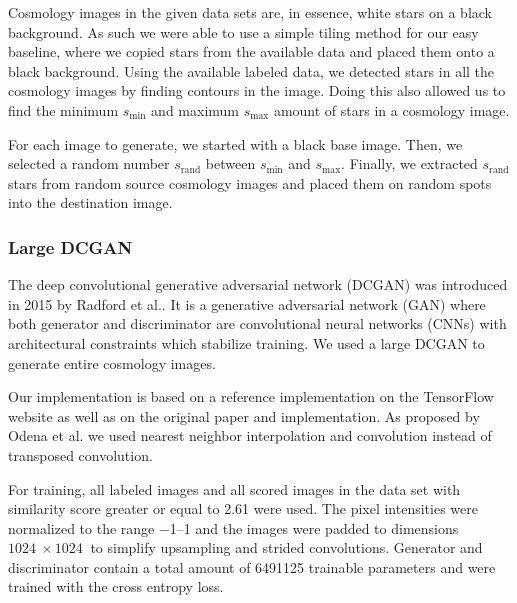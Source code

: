 \documentclass[10pt,conference,compsocconf]{IEEEtran}
\begin{document}

Cosmology images in the given data sets are, in essence, white stars on a black background. As such we were able to use a simple tiling method for our easy baseline, where we copied stars from the available data and placed them onto a black background. Using the available labeled data, we detected stars in all the cosmology images by finding contours in the image. Doing this also allowed us to find the minimum $s_{\text{min}}$ and maximum $s_{\text{max}}$ amount of stars in a cosmology image.

For each image to generate, we started with a black base image. Then, we selected a random number $s_{\text{rand}}$ between $s_{\text{min}}$ and $s_{\text{max}}$. Finally, we extracted $s_{\text{rand}}$ stars from random source cosmology images and placed them on random spots into the destination image.

\subsubsection{Large DCGAN}

The deep convolutional generative adversarial network (DCGAN) was introduced in 2015 by Radford et al.\@ \cite{Radford}. It is a generative adversarial network (GAN) where both generator and discriminator are convolutional neural networks (CNNs) with architectural constraints which stabilize training. We used a large DCGAN to generate entire cosmology images. 

Our implementation is based on a reference implementation on the TensorFlow website \cite{dcgantf} as well as on the original paper and implementation. As proposed by Odena et al.\@ \cite{Odena} we used nearest neighbor interpolation and convolution instead of transposed convolution.

For training, all labeled images and all scored images in the data set with similarity score greater or equal to \SI{2.61}{} were used. The pixel intensities were normalized to the range \SIrange{-1}{1}{} and the images were padded to dimensions $\SI{1024}{}\times\SI{1024}{}$ to simplify upsampling and strided convolutions. Generator and discriminator contain a total amount of \SI{6491125}{} trainable parameters and were trained with the cross entropy loss.
\end{document}

